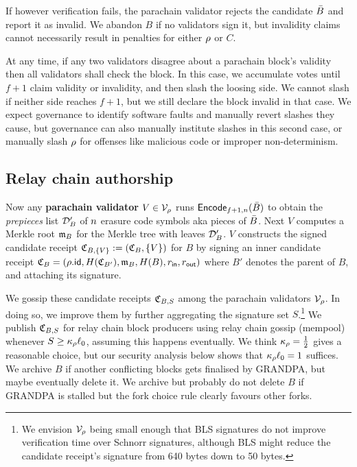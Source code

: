 If however verification fails, the parachain validator rejects the candidate $\bar{B}$ and report it as invalid.  We abandon $B$ if no validators sign it, but invalidity claims cannot necessarily result in penalties for either $\rho$ or $C$.  

At any time, if any two validators disagree about a parachain block's validity then all validators shall check the block.  In this case, we accumulate votes until $f+1$ claim validity or invalidity, and then slash the loosing side.  We cannot slash if neither side reaches $f+1$, but we still declare the block invalid in that case.  We expect governance to identify software faults and manually revert slashes they cause, but governance can also manually institute slashes in this second case, or manually slash $\rho$ for offenses like malicious code or improper non-determinism. 


\subsection{Relay chain authorship} %


Now any {\bf parachain validator} $V \in \mathcal{V}_{\rho}$ runs $\mathsf{Encode}_{f+1,n}(\bar{B})$ to obtain the {\em prepieces} list $\mathcal{D}'_B$ of $n$ erasure code symbols aka pieces of $\bar{B}$.  Next $V$ computes a Merkle root $\mathfrak{m}_B$ for the Merkle tree with leaves $\mathcal{D}'_B$.  $V$ constructs the signed candidate receipt $\mathfrak{C}_{B,\{V\}} := (\mathfrak{C}_{B},\{V\})$ for $B$ by signing an inner candidate receipt $\mathfrak{C}_B = (\rho.\mathsf{id},H(\mathfrak{C}_{B'}),\mathfrak{m}_B,H(B),r_{\mathsf{in}},r_{\mathsf{out}})$ where $B'$ denotes the parent of $B$, and attaching its signature.  

We gossip these candidate receipts $\mathfrak{C}_{B,S}$ among the parachain validators $\mathcal{V}_{\rho}$.  In doing so, we improve them by further aggregating the signature set $S$.\footnote{We envision $\mathcal{V}_{\rho}$ being small enough that BLS signatures do not improve verification time over Schnorr signatures, although BLS might reduce the candidate receipt's signature from 640 bytes down to 50 bytes.}  We publish $\mathfrak{C}_{B,S}$ for relay chain block producers using relay chain gossip (mempool) whenever $S \ge \kappa_{\rho} \ell_0$, assuming this happens eventually.  We think $\kappa_{\rho} = {1\over2}$ gives a reasonable choice, but our security analysis below shows that $\kappa_{\rho} \ell_0 = 1$ suffices.  We archive $B$ if another conflicting blocks gets finalised by GRANDPA, but maybe eventually delete it.  We archive but probably do not delete $B$ if GRANDPA is stalled but the fork choice rule clearly favours other forks.  

